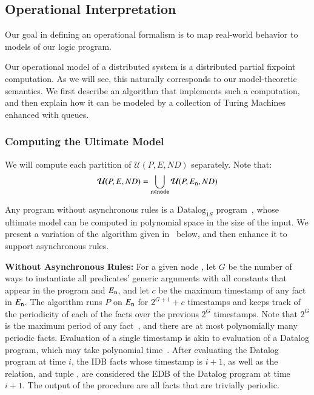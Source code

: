 \subsection{Operational Interpretation}
Our goal in defining an operational formalism is to map real-world behavior to models of our logic program. 

Our operational model of a distributed system is a distributed partial fixpoint computation.  As we will see, this naturally corresponds to our model-theoretic semantics.  We first describe an algorithm that implements such a computation, and then explain how it can be modeled by a collection of Turing Machines enhanced with queues.

\subsubsection{Computing the Ultimate Model}

We will compute each partition of $\mathcal{U}(P, E, ND)$ separately.  Note that:
$$\mathcal{U}(P, E, ND) = \bigcup_{\text{\dedalus{{\scriptsize n}}} \in \text{\dedalus{{\scriptsize node}}}} \mathcal{U}(P, E_{\text{\dedalus{{\scriptsize n}}}}, ND)$$

Any \lang program without asynchronous rules is a $\text{Datalog}_{1S}$ program~\cite{tdd}, whose ultimate model can be computed in polynomial space in the size of the input.  We present a variation of the algorithm given in~\cite{tdd} below, and then enhance it to support asynchronous rules.

\vspace{1em}
{\bf Without Asynchronous Rules:}
For a given node , let $G$ be the number of ways to instantiate all predicates' generic arguments with all constants that appear in the program and $E_{\text{\dedalus{{\scriptsize n}}}}$, and let $c$ be the maximum timestamp of any fact in $E_{\text{\dedalus{{\scriptsize n}}}}$.  The algorithm runs $P$ on $E_{\text{\dedalus{{\scriptsize n}}}}$ for $2^{G+1} + c$ timestamps and keeps track of the periodicity of each of the facts over the previous $2^G$ timestamps.  Note that $2^G$ is the maximum period of any fact~\cite{tdd}, and there are at most polynomially many periodic facts.  Evaluation of a single timestamp is akin to evaluation of a Datalog program, which may take polynomial time~\cite{immerman-ptime, vardi-ptime}.  After evaluating the Datalog program at time $i$, the IDB facts whose timestamp is $i+1$, as well as the  relation, and tuple , are considered the EDB of the Datalog program at time $i+1$.  The output of the procedure are all facts that are trivially periodic.

